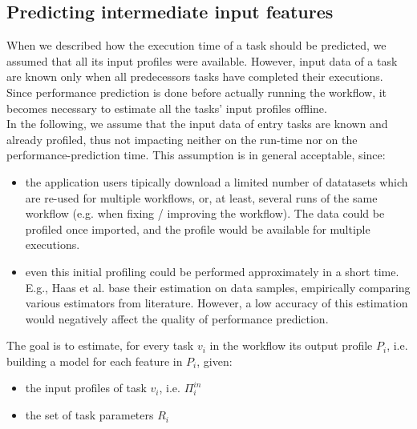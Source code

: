 \documentclass[a4paper, 10pt, conference]{ieeeconf}      %
\begin{document}
\subsection{Predicting intermediate input features}

\label{section:intermediate_input}
When we described how the execution time of a task should be predicted, we assumed that all its input profiles were available. However, input data of a task are known only when all predecessors tasks have completed their executions.\\
Since performance prediction is done before actually running the workflow, it becomes necessary to estimate all the tasks' input profiles  offline.\\
In the following, we assume that the input data of entry tasks are known and already profiled, thus not impacting neither on the run-time nor on the performance-prediction time. This assumption is in general acceptable, since:
\begin{itemize}
    \item the application users tipically download a limited number of datatasets which are re-used for multiple workflows, or, at least, several runs of the same workflow (e.g. when fixing / improving the workflow). The data could be profiled once imported, and the profile would be available for multiple executions.
    \item  even this initial profiling could be performed approximately in a short time. E.g., Haas et al.\cite{haas1995sampling} base their estimation on data samples, empirically comparing various estimators from literature. 
    However, a low accuracy of this estimation would negatively affect the quality of performance prediction.
\end{itemize}

 The goal is to estimate, for every task $v_i$ in the workflow its output profile $P_i$, i.e. building a model for each feature in $P_i$, given:
\begin{itemize}
    \item the input profiles of task $v_i$, i.e. $\Pi^{in}_i$
    \item the set of task parameters $R_i$
\end{itemize}{}
\end{document}
